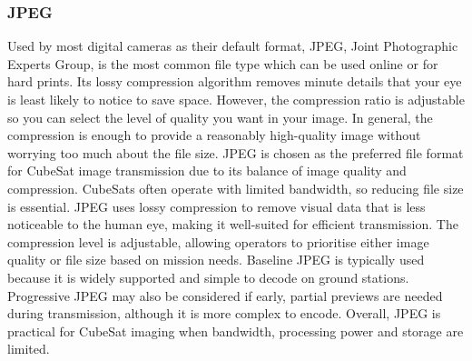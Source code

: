 \subsubsection{JPEG}
Used by most digital cameras as their default format, JPEG, Joint Photographic Experts Group, is the most common file type which can be used online or for hard prints.
Its lossy compression algorithm removes minute details that your eye is least likely to notice to save space. However, the compression ratio is adjustable so you can select the level of quality you want in your image. In general, the compression is enough to provide a reasonably high-quality image without worrying too much about the file size.
\nl 
JPEG is chosen as the preferred file format for CubeSat image transmission due to its balance of image quality and compression.
CubeSats often operate with limited bandwidth, so reducing file size is essential.
JPEG uses lossy compression to remove visual data that is less noticeable to the human eye, making it well-suited for efficient transmission.
The compression level is adjustable, allowing operators to prioritise either image quality or file size based on mission needs.
Baseline JPEG is typically used because it is widely supported and simple to decode on ground stations.
Progressive JPEG may also be considered if early, partial previews are needed during transmission, although it is more complex to encode.
Overall, JPEG is practical for CubeSat imaging when bandwidth, processing power and storage are limited.

